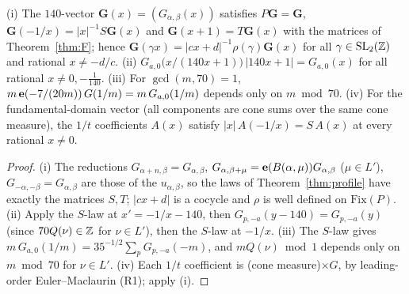 \begin{corollary}\label{cor:profile}
(i) The $140$-vector $\mathbf G(x)=(G_{\alpha,\beta}(x))$ satisfies $P\mathbf G=\mathbf G$, $\mathbf G(-1/x)=|x|^{-1}S\mathbf G(x)$ and $\mathbf G(x+1)=T\mathbf G(x)$ with
the matrices of Theorem~\ref{thm:F}; hence $\mathbf G(\gamma x)=|cx+d|^{-1}\rho(\gamma)\mathbf G(x)$ for all $\gamma\in\mathrm{SL}_2(\mathbb{Z})$ and rational $x\ne-d/c$.
(ii) $G_{a,0}\bigl(x/(140x+1)\bigr)\,|140x+1|=G_{a,0}(x)$ for all rational $x\neq0,-\tfrac1{140}$.
(iii) For $\gcd(m,70)=1$, $m\,\mathbf{e}(-7/(20m))\,G(1/m)=m\,G_{a,0}(1/m)$ depends only on $m\bmod70$.
(iv) For the fundamental-domain vector (all components are cone sums over the same cone measure), the $1/t$ coefficients $A(x)$ satisfy
$|x|\,A(-1/x)=S\,A(x)$ at every rational $x\ne0$.
\end{corollary}
\begin{proof}
(i) The reductions $G_{\alpha+n,\beta}=G_{\alpha,\beta}$, $G_{\alpha,\beta+\mu}=\mathbf{e}(B(\alpha,\mu))G_{\alpha,\beta}$ ($\mu\in L'$), $G_{-\alpha,-\beta}=G_{\alpha,\beta}$ are those of
the $u_{\alpha,\beta}$, so the laws of Theorem~\ref{thm:profile} have exactly the matrices $S,T$; $|cx+d|$ is a cocycle and $\rho$ is well defined on
$\mathrm{Fix}(P)$. (ii) Apply the $S$-law at $x'=-1/x-140$, then $G_{p,-a}(y-140)=G_{p,-a}(y)$ (since $70Q(\nu)\in\mathbb{Z}$ for $\nu\in L'$), then the $S$-law at
$-1/x$. (iii) The $S$-law gives $m\,G_{a,0}(1/m)=35^{-1/2}\sum_pG_{p,-a}(-m)$, and $mQ(\nu)\bmod1$ depends only on $m\bmod70$ for $\nu\in L'$.
(iv) Each $1/t$ coefficient is (cone measure)$\times G$, by leading-order Euler--Maclaurin (R1); apply (i).
\end{proof}

